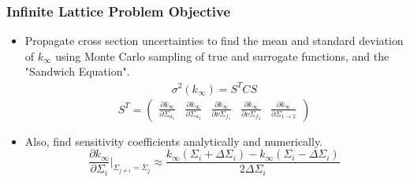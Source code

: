 \documentclass{beamer}
\begin{document}
\begin{frame}
\frametitle{Infinite Lattice Problem Objective}

\begin{itemize}
  \item Propagate cross section uncertainties to find the mean and standard deviation of $k_{\infty}$ using Monte Carlo sampling of true and surrogate functions, and the "Sandwich Equation".
\begin{align*}
 \sigma^2(k_{\infty}) = S^TCS
\end{align*} 
\begin{equation}
 S^T = \left(
  \begin{array}{ccccc}
   \frac{\partial k_{\infty}}{\partial\Sigma_{a_1}} &
    \frac{\partial k_{\infty}}{\partial\Sigma_{a_2}} &
     \frac{\partial k_{\infty}}{\partial\nu\Sigma_{f_1}} &
      \frac{\partial k_{\infty}}{\partial\nu\Sigma_{f_2}} &
       \frac{\partial k_{\infty}}{\partial\Sigma_{1\rightarrow 2}}
 \end{array}\right) \nonumber
\end{equation} 
  \item Also, find sensitivity coefficients analytically and numerically.
\begin{equation}
 \frac{\partial k_{\infty}}{\partial \Sigma_i}\biggr\rvert_
  {\Sigma_{j\neq i} = \bar{\Sigma}_j}
   \approx \frac{k_{\infty}(\Sigma_i + \Delta\Sigma_i) - 
    k_{\infty}(\Sigma_i - \Delta\Sigma_i)}
     {2\Delta\Sigma_i} \nonumber
\end{equation}        
           
\end{itemize}

\end{frame}
\end{document}
